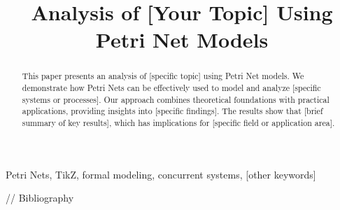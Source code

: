 \documentclass[conference]{IEEEtran}
\begin{document}
\title{Analysis of [Your Topic] Using Petri Net Models}



\maketitle

\begin{abstract}
This paper presents an analysis of [specific topic] using Petri Net models. We demonstrate how Petri Nets can be effectively used to model and analyze [specific systems or processes]. Our approach combines theoretical foundations with practical applications, providing insights into [specific findings]. The results show that [brief summary of key results], which has implications for [specific field or application area].
\end{abstract}

\begin{IEEEkeywords}
Petri Nets, TikZ, formal modeling, concurrent systems, [other keywords]
\end{IEEEkeywords}








// Bibliography


\end{document}
